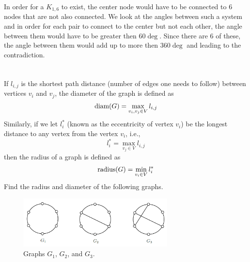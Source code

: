 \documentclass[]{article}
\numberwithin{equation}{section}
\newcommand{\diam}{\textnormal{diam}}
\newcommand{\radius}{\textnormal{radius}}
\begin{document}
In order for a $K_{1,6}$ to exist, the center node would have to be connected to 6 nodes that are not also connected.
We look at the angles between such a system and in order for each pair to connect to the center but not each other, the angle between them would have to be greater then $60 \deg$. 
Since there are 6 of these, the angle between them would add up to more then $360 \deg$ and leading to the contradiction.


\newpage
\section{}
If $l_{i,j}$ is the shortest path distance (number of edges one needs to follow) between vertices $v_i$ and $v_j$, 
the diameter of the graph is defined as\[
	\diam(G) = \max_{v_i,v_j \in V} l_{i,j}
\] Similarly, if we let $l_{i}^{*}$ (known as the eccentricity of vertex $v_i$) be the longest distance to any vertex from the vertex $v_i$, i.e.,\[
	l_{i}^{*} = \max_{v_j \in V} l_{i,j}
\] then the radius of a graph is defined as\[
	\radius(G) = \min_{v_i \in V} l_{i}^{*}
\] Find the radius and diameter of the following graphs.

\begin{figure}[h]
	\centering
	\includegraphics[width=0.7\textwidth]{figs/pblm6.png}
	\caption{Graphs $G_1$, $G_2$, and $G_3$.}
	\label{fig:pblm6}
\end{figure}
\end{document}
